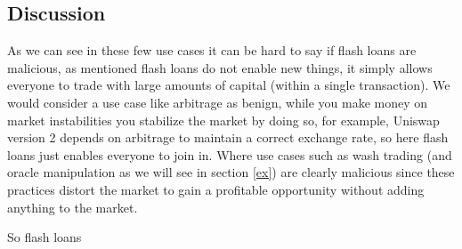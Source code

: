 \subsection{Discussion}
As we can see in these few use cases it can be hard to say if flash
loans are malicious, as mentioned flash loans do not enable new
things, it simply allows everyone to trade with large amounts of
capital (within a single transaction). We would consider a use case
like arbitrage as benign, while you make money on market instabilities
you stabilize the market by doing so, for example, Uniswap version 2
depends on arbitrage to maintain a correct exchange rate, so here
flash loans just enables everyone to join in. Where use cases such as
wash trading (and oracle manipulation as we will see in section
\ref{ex}) are clearly malicious since these practices distort the
market to gain a profitable opportunity without adding anything to the
market.

So flash loans
